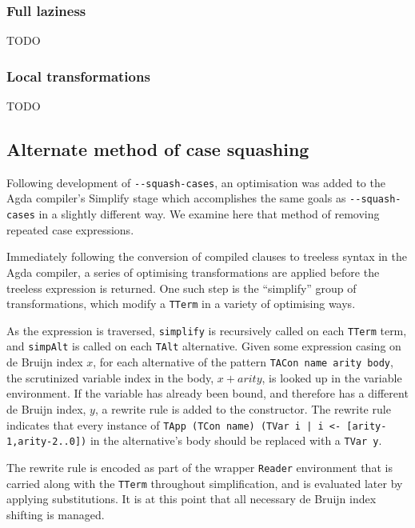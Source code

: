 \subsubsection*{Full laziness}

TODO

\subsubsection*{Local transformations}

TODO

\subsection{Alternate method of case squashing}

Following development of \texttt{-{}-squash-cases}, an optimisation was added to the Agda compiler's Simplify stage which accomplishes the same goals as \texttt{-{}-squash-cases} in a slightly different way. We examine here that method of removing repeated case expressions.

Immediately following the conversion of compiled clauses to treeless syntax in the Agda compiler, a series of optimising transformations are applied before the treeless expression is returned. 
One such step is the ``simplify'' group of transformations, which modify a \lstinline{TTerm} in a variety of optimising ways.

As the expression is traversed, \lstinline{simplify} is recursively called on each \lstinline{TTerm} term, and \lstinline{simpAlt} is called on each \lstinline{TAlt} alternative. Given some expression casing on de Bruijn index $x$, for each alternative of the pattern \lstinline{TACon name arity body}, the scrutinized variable index in the body, $x + arity$, is looked up in the variable environment. If the variable has already been bound, and therefore has a different de Bruijn index, $y$, a rewrite rule is added to the constructor. The rewrite rule indicates that every instance of \lstinline{TApp (TCon name) (TVar i | i <- [arity-1,arity-2..0])} in the alternative's body should be replaced with a \lstinline{TVar y}.

The rewrite rule is encoded as part of the wrapper \lstinline{Reader} environment that is carried along with the \lstinline{TTerm} throughout simplification, and is evaluated later by applying substitutions. It is at this point that all necessary de Bruijn index shifting is managed.

